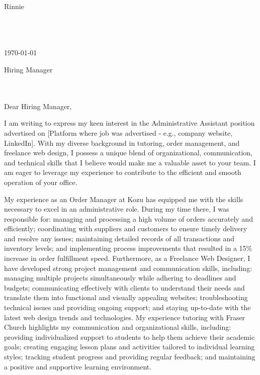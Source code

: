 \documentclass[letterpaper,11pt]{article}
\begin{document}
Rinnie \\
[Address Redacted for Privacy] \\
[Phone Number Redacted for Privacy] \\
[Email Address Redacted for Privacy] \\
\vspace{20pt}

\today \\
\vspace{20pt}

Hiring Manager \\
[Company Name Redacted for Privacy] \\
[Company Address Redacted for Privacy] \\
\vspace{20pt}

Dear Hiring Manager, \\
\vspace{10pt}

I am writing to express my keen interest in the Administrative Assistant position advertised on [Platform where job was advertised - e.g., company website, LinkedIn]. With my diverse background in tutoring, order management, and freelance web design, I possess a unique blend of organizational, communication, and technical skills that I believe would make me a valuable asset to your team. I am eager to leverage my experience to contribute to the efficient and smooth operation of your office.
\vspace{10pt}

My experience as an Order Manager at Kozu has equipped me with the skills necessary to excel in an administrative role. During my time there, I was responsible for: managing and processing a high volume of orders accurately and efficiently; coordinating with suppliers and customers to ensure timely delivery and resolve any issues; maintaining detailed records of all transactions and inventory levels; and implementing process improvements that resulted in a 15\% increase in order fulfillment speed. Furthermore, as a Freelance Web Designer, I have developed strong project management and communication skills, including: managing multiple projects simultaneously while adhering to deadlines and budgets; communicating effectively with clients to understand their needs and translate them into functional and visually appealing websites; troubleshooting technical issues and providing ongoing support; and staying up-to-date with the latest web design trends and technologies. My experience tutoring with Fraser Church highlights my communication and organizational skills, including: providing individualized support to students to help them achieve their academic goals; creating engaging lesson plans and activities tailored to individual learning styles; tracking student progress and providing regular feedback; and maintaining a positive and supportive learning environment.
\vspace{10pt}
\end{document}
